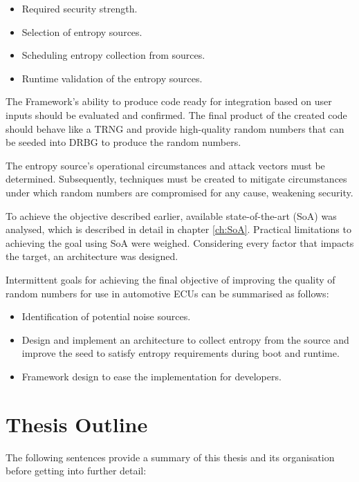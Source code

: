 \begin{itemize}
	\item Required security strength.
	\item Selection of entropy sources.
	\item Scheduling entropy collection from sources.
	\item Runtime validation of the entropy sources.
\end{itemize}

The Framework’s ability to produce code ready for integration based on user inputs should be evaluated and confirmed. The final product of the created code should behave like a TRNG and provide high-quality random numbers that can be seeded into DRBG to produce the random numbers.

The entropy source’s operational circumstances and attack vectors must be determined. Subsequently, techniques must be created to mitigate circumstances under which random numbers are compromised for any cause, weakening security.

To achieve the objective described earlier, available state-of-the-art (SoA) was analysed, which is described in detail in chapter \ref{ch:SoA}. Practical limitations to achieving the goal using SoA were weighed. Considering every factor that impacts the target, an architecture was designed.

Intermittent goals for achieving the final objective of improving the quality of random numbers for use in automotive ECUs can be summarised as follows:
\begin{itemize}
	\item Identification of potential noise sources.
	\item Design and implement an architecture to collect entropy from the source and improve the seed to satisfy entropy requirements during boot and runtime.
	\item Framework design to ease the implementation for developers.
\end{itemize}

%
%
\section{Thesis Outline}
\label{sec:intro:Thesis Outline}

The following sentences provide a summary of this thesis and its organisation before getting into further detail:

